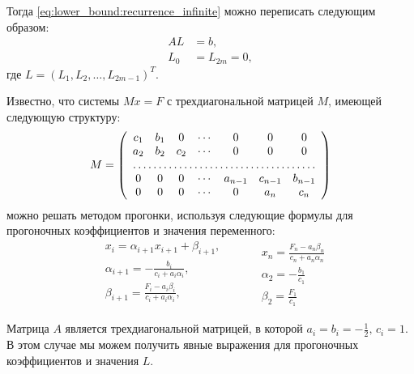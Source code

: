 Тогда \eqref{eq:lower_bound:recurrence_infinite} можно переписать следующим образом:
\[
\begin{aligned}
AL &= b, \\
L_0 &= L_{2m} = 0,
\end{aligned}
\]
где $ L = (L_1, L_2, \ldots, L_{2m-1})^T $.

Известно, что системы $ Mx = F $ с трехдиагональной матрицей $ M $, имеющей следующую структуру:
\[
M = \left(\begin{array}{ccccccc}
c_1 & b_1 & 0 & \cdots & 0 & 0 & 0 \\
a_2 & b_2 & c_2 & \cdots & 0 & 0 & 0 \\
\hdotsfor{7} \\
0 & 0 & 0 & \cdots & a_{n-1} & c_{n-1} & b_{n-1} \\
0 & 0 & 0 & \cdots & 0 & a_n & c_n
\end{array}\right)
\]
можно решать методом прогонки, используя следующие формулы для прогоночных коэффициентов и значения переменного:
\begin{equation}
\label{eq:tridiagonal:formulas}
\begin{split}
    &x_i = \alpha_{i+1} x_{i+1} + \beta_{i+1}, \\
    &\alpha_{i+1} = -\frac{b_i}{c_i + a_i\alpha_i}, \\
    &\beta_{i+1} = \frac{F_i - a_i\beta_i}{c_i + a_i\alpha_i}, \\
\end{split}
\qquad
\begin{split}
    &x_n = \frac{F_n - a_n\beta_n}{c_n + a_n\alpha_n} \\
    &\alpha_2 = -\frac{b_1}{c_1} \\
    &\beta_2 = \frac{F_1}{c_1}
\end{split}
\end{equation}

Матрица $ A $ является трехдиагональной матрицей, в которой $ a_i = b_i = -\frac{1}{2}, \, c_i = 1 $. В этом случае мы можем получить явные выражения для прогоночных коэффициентов и значения $ L $.

